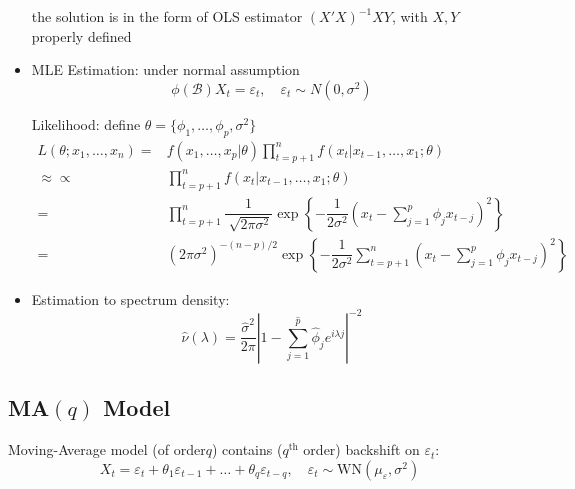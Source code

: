 \begin{itemize}[topsep=2pt,itemsep=0pt]
        the solution is in the form of OLS estimator $ (X'X)^{-1}XY $, with $ X,Y $ properly defined
        
        \item MLE Estimation: under normal assumption
        \begin{equation}
            \phi (\mathscr{B} )X_t=\varepsilon _t,\quad \varepsilon _t\sim N(0,\sigma ^2) 
        \end{equation}

        Likelihood: define $ \theta =\{\phi _1,\ldots,\phi _p,\sigma ^2\} $
        \begin{align}
            L(\theta ; x_1,\ldots ,x_n)=&f(x_1,\ldots,x_p|\theta )\prod_{t=p+1}^nf(x_t|x_{t-1},\ldots,x_{1};\theta )\\
            \approx \propto &\prod_{t=p+1}^nf(x_t|x_{t-1},\ldots,x_{1};\theta )\\
            =&\prod_{t=p+1}^n \dfrac{1}{\sqrt[]{2\pi \sigma ^2}}\exp\left\{ -\dfrac{1}{2\sigma ^2}(x_t-\sum_{j=1}^p \phi _jx_{t-j})^2 \right\}\\
            =&(2\pi\sigma ^2)^{-(n-p)/2}\exp\left\{ -\dfrac{1}{2\sigma ^2}\sum_{t=p+1}^n (x_t-\sum_{j=1}^p \phi _jx_{t-j})^2\right\}
        \end{align}
        
        \item Estimation to spectrum density:
        \begin{equation}
            \hat{\nu }(\lambda )=\dfrac{\hat{\sigma }^2}{2\pi}\left\vert 1-\sum_{j=1}^{\hat{p}}\hat{\phi }_je^{i\lambda j} \right\vert^{-2} 
        \end{equation}
        
    \end{itemize}
    
        


\subsection{MA$ (q) $ Model}

    Moving-Average model (of order$ q $) contains ($ q^\mathrm{th}  $ order) backshift on $ \varepsilon _t $:
    \begin{equation}
        X_t=\varepsilon _t+\theta _1\varepsilon _{t-1}+\ldots +\theta _q\varepsilon _{t-q},\quad \varepsilon _t\sim \mathrm{WN}(\mu_\varepsilon  ,\sigma ^2) 
    \end{equation}

